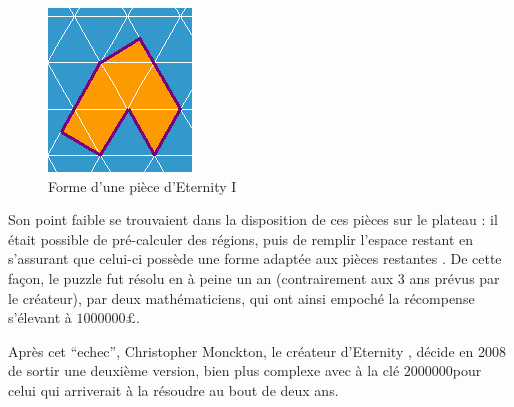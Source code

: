 \begin{figure}[H]
		\includegraphics[width=\linewidth]{images/eternity_1_piece.jpg}
		\caption{Forme d'une pièce d'Eternity I} \label{fig:eternity_1_piece}
		\endminipage\hfill
	\end{figure}

	Son point faible se trouvaient dans la disposition de ces pièces sur le plateau : il était possible de pré-calculer des régions, puis de remplir l'espace restant en s'assurant que celui-ci possède une forme adaptée aux pièces restantes \cite{resolutioneternity}.
	De cette façon, le puzzle fut résolu en à peine un an (contrairement aux 3 ans prévus par le créateur), par deux mathématiciens, qui ont ainsi empoché la récompense s'élevant à $1000000\pounds$.
	
	Après cet \enquote{echec}, Christopher Monckton, le créateur d'Eternity \cite{eternity2maker}, décide en 2008 de sortir une deuxième version, bien plus complexe avec à la clé $2000000$\textdollar pour celui qui arriverait à la résoudre au bout de deux ans.
	
